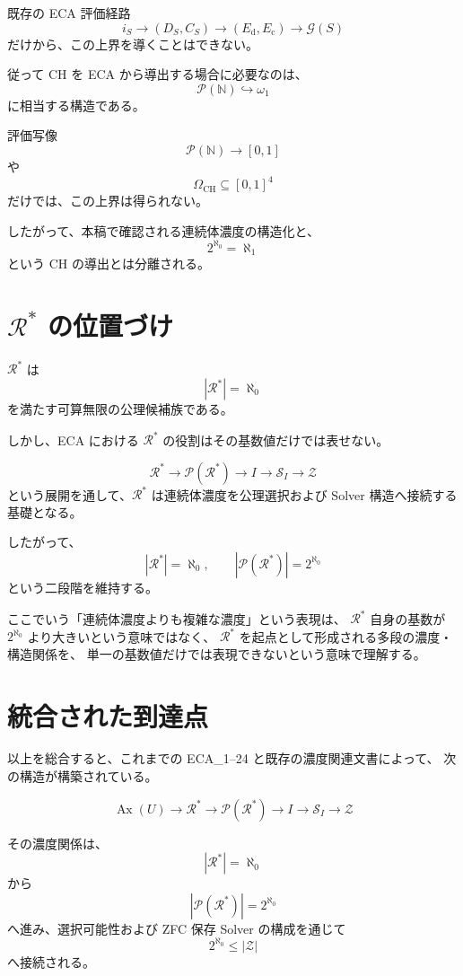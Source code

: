 \documentclass[11pt,a4paper]{article}
\newcommand{\Pow}{\mathcal P}
\newcommand{\Solver}{\mathcal S}
\newcommand{\Zset}{\mathcal Z}
\newcommand{\Rstar}{\mathcal R^*}
\newcommand{\N}{\mathbb N}
\begin{document}
既存の ECA 評価経路
\[
i_S
\longrightarrow
(D_S,C_S)
\longrightarrow
(E_{\mathrm d},E_{\mathrm c})
\longrightarrow
\mathcal G(S)
\]
だけから、この上界を導くことはできない。

従って CH を ECA から導出する場合に必要なのは、
\[
\boxed{
\Pow(\N)\hookrightarrow\omega_1
}
\]
に相当する構造である。

評価写像
\[
\Pow(\N)\to[0,1]
\]
や
\[
\Omega_{\mathrm{CH}}\subseteq[0,1]^4
\]
だけでは、この上界は得られない。

したがって、本稿で確認される連続体濃度の構造化と、
\[
2^{\aleph_0}=\aleph_1
\]
という CH の導出とは分離される。

\section{$\Rstar$ の位置づけ}

$\Rstar$ は
\[
|\Rstar|=\aleph_0
\]
を満たす可算無限の公理候補族である。

しかし、ECA における $\Rstar$ の役割はその基数値だけでは表せない。

\[
\Rstar
\longrightarrow
\Pow(\Rstar)
\longrightarrow
I
\longrightarrow
\Solver_I
\longrightarrow
\Zset
\]
という展開を通して、$\Rstar$ は連続体濃度を公理選択および Solver
構造へ接続する基礎となる。

したがって、
\[
\boxed{
|\Rstar|=\aleph_0,
\qquad
|\Pow(\Rstar)|=2^{\aleph_0}
}
\]
という二段階を維持する。

ここでいう「連続体濃度よりも複雑な濃度」という表現は、
$\Rstar$ 自身の基数が $2^{\aleph_0}$ より大きいという意味ではなく、
$\Rstar$ を起点として形成される多段の濃度・構造関係を、
単一の基数値だけでは表現できないという意味で理解する。

\section{統合された到達点}

以上を総合すると、これまでの ECA_1--24 と既存の濃度関連文書によって、
次の構造が構築されている。

\[
\boxed{
\operatorname{Ax}(U)
\longrightarrow
\Rstar
\longrightarrow
\Pow(\Rstar)
\longrightarrow
I
\longrightarrow
\Solver_I
\longrightarrow
\Zset
}
\]

その濃度関係は、
\[
\boxed{|\Rstar|=\aleph_0}
\]
から
\[
\boxed{|\Pow(\Rstar)|=2^{\aleph_0}}
\]
へ進み、選択可能性および ZFC 保存 Solver の構成を通じて
\[
\boxed{2^{\aleph_0}\leq|\Zset|}
\]
へ接続される。
\end{document}
